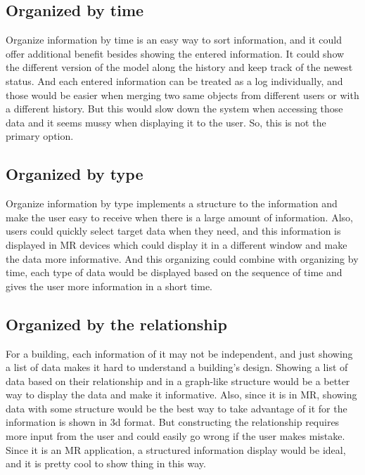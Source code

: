 \documentclass[10pt,letter paper]{article}
\begin{document}
\subsection{Organized by time}
Organize information by time is an easy way to sort information, and it could offer additional benefit besides showing the entered information. It could show the different version of the model along the history and keep track of the newest status. And each entered information can be treated as a log individually, and those would be easier when merging two same objects from different users or with a different history.\newline
\noindent
\newline
But this would slow down the system when accessing those data and it seems mussy when displaying it to the
user. So, this is not the primary option.

\subsection{Organized by type}
Organize information by type implements a structure to the information and make the user easy to receive when there is a large amount of information. Also, users could quickly select target data when they need, and this information is displayed in MR devices which could display it in a different window and make the data more informative. And this organizing could combine with organizing by time, each type of data would be displayed based on the sequence of time and gives the user more information in a short time.

\subsection{Organized by the relationship}
For a building, each information of it may not be independent, and just showing a list of data makes it hard to understand a building’s design. Showing a list of data based on their relationship and in a graph-like structure would be a better way to display the data and make it informative. Also, since it is in MR, showing data with some structure would be the best way to take advantage of it for the information is shown in 3d format.\newline
\noindent
\newline
But constructing the relationship requires more input from the user and could easily go wrong if the user makes mistake. Since it is an MR application, a structured information display would be ideal, and it is pretty cool to show thing in this way.
\end{document}
